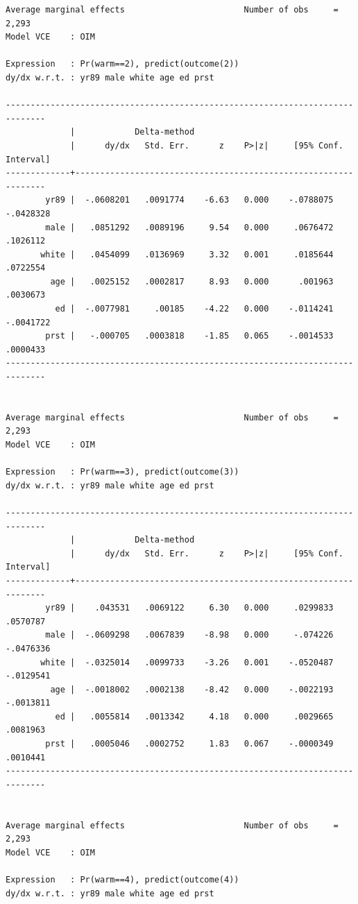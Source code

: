 \documentclass[
]{book}
\begin{document}
\begin{verbatim}
Average marginal effects                        Number of obs     =      2,293
Model VCE    : OIM

Expression   : Pr(warm==2), predict(outcome(2))
dy/dx w.r.t. : yr89 male white age ed prst

------------------------------------------------------------------------------
             |            Delta-method
             |      dy/dx   Std. Err.      z    P>|z|     [95% Conf. Interval]
-------------+----------------------------------------------------------------
        yr89 |  -.0608201   .0091774    -6.63   0.000    -.0788075   -.0428328
        male |   .0851292   .0089196     9.54   0.000     .0676472    .1026112
       white |   .0454099   .0136969     3.32   0.001     .0185644    .0722554
         age |   .0025152   .0002817     8.93   0.000      .001963    .0030673
          ed |  -.0077981     .00185    -4.22   0.000    -.0114241   -.0041722
        prst |   -.000705   .0003818    -1.85   0.065    -.0014533    .0000433
------------------------------------------------------------------------------


Average marginal effects                        Number of obs     =      2,293
Model VCE    : OIM

Expression   : Pr(warm==3), predict(outcome(3))
dy/dx w.r.t. : yr89 male white age ed prst

------------------------------------------------------------------------------
             |            Delta-method
             |      dy/dx   Std. Err.      z    P>|z|     [95% Conf. Interval]
-------------+----------------------------------------------------------------
        yr89 |    .043531   .0069122     6.30   0.000     .0299833    .0570787
        male |  -.0609298   .0067839    -8.98   0.000     -.074226   -.0476336
       white |  -.0325014   .0099733    -3.26   0.001    -.0520487   -.0129541
         age |  -.0018002   .0002138    -8.42   0.000    -.0022193   -.0013811
          ed |   .0055814   .0013342     4.18   0.000     .0029665    .0081963
        prst |   .0005046   .0002752     1.83   0.067    -.0000349    .0010441
------------------------------------------------------------------------------


Average marginal effects                        Number of obs     =      2,293
Model VCE    : OIM

Expression   : Pr(warm==4), predict(outcome(4))
dy/dx w.r.t. : yr89 male white age ed prst


\end{verbatim}
\end{document}
